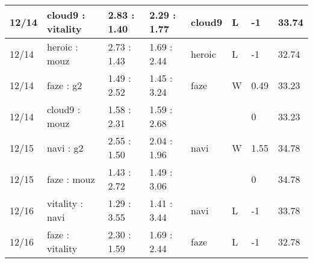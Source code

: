 \begin{small}
\begin{longtable}{|l|l|l|l|l|l|l|l|}
	12/14                               & cloud9 : vitality                   & 2.83 : 1.40                             & 2.29 : 1.77                             & cloud9                            & L                                 & -1                                   & 33.74                             \\ \hline
	12/14                               & heroic : mouz                       & 2.73 : 1.43                             & 1.69 : 2.44                             & heroic                            & L                                 & -1                                   & 32.74                             \\ \hline
	12/14                               & faze : g2                           & 1.49 : 2.52                             & 1.45 : 3.24                             & faze                              & W                                 & 0.49                                 & 33.23                             \\ \hline
	12/14                               & cloud9 : mouz                       & 1.58 : 2.31                             & 1.59 : 2.68                             &                                   &                                   & 0                                    & 33.23                             \\ \hline
	12/15                               & navi : g2                           & 2.55 : 1.50                             & 2.04 : 1.96                             & navi                              & W                                 & 1.55                                 & 34.78                             \\ \hline
	12/15                               & faze : mouz                         & 1.43 : 2.72                             & 1.49 : 3.06                             &                                   &                                   & 0                                    & 34.78                             \\ \hline
	12/16                               & vitality : navi                     & 1.29 : 3.55                             & 1.41 : 3.44                             & navi                              & L                                 & -1                                   & 33.78                             \\ \hline
	12/16                               & faze : vitality                     & 2.30 : 1.59                             & 1.69 : 2.44                             & faze                              & L                                 & -1                                   & 32.78                             \\ \hline
\end{longtable}
\end{small}